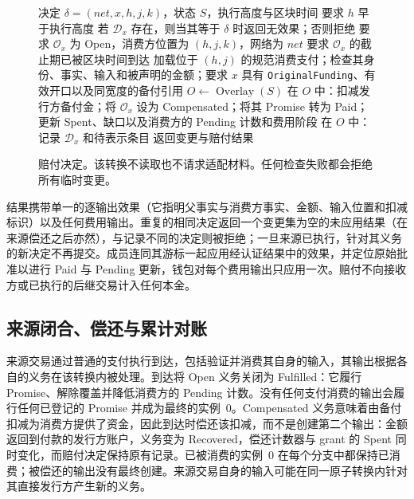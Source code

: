 \begin{figure}[t]
  \small
  \begin{algorithmic}[1]
    \REQUIRE 决定 $\delta=(\mathit{net},x,h,j,k)$，状态 $S$，执行高度与区块时间
    \STATE 要求 $h$ 早于执行高度
    \STATE 若 $\mathcal D_x$ 存在，则当其等于 $\delta$ 时返回无效果；否则拒绝
    \STATE 要求 $\mathcal O_x$ 为 Open，消费方位置为 $(h,j,k)$，网络为 $\mathit{net}$
    \STATE 要求 $\mathcal O_x$ 的截止期已被区块时间到达
    \STATE 加载位于 $(h,j)$ 的规范消费支付；检查其身份、事实、输入和被声明的金额；要求 $x$ 具有 \texttt{OriginalFunding}、有效开口以及同宽度的备付引用
    \STATE $O\gets\operatorname{Overlay}(S)$
    \STATE 在 $O$ 中：扣减发行方备付金；将 $\mathcal O_x$ 设为 Compensated；将其 Promise 转为 Paid；更新 Spent、缺口以及消费方的 Pending 计数和费用阶段
    \STATE 在 $O$ 中：记录 $\mathcal D_x$ 和待表示条目
    \STATE 返回变更与赔付结果
  \end{algorithmic}
  \caption{赔付决定。该转换不读取也不请求适配材料。任何检查失败都会拒绝所有临时变更。}
  \label{fig:protocol-decision}
\end{figure}

结果携带单一的逐输出效果（它指明父事实与消费方事实、金额、输入位置和扣减标识）以及任何费用输出。重复的相同决定返回一个变更集为空的未应用结果（在来源偿还之后亦然），与记录不同的决定则被拒绝；一旦来源已执行，针对其义务的新决定不再提交。成员连同其游标一起应用经认证结果中的效果，并定位原始批准以进行 Paid 与 Pending 更新，钱包对每个费用输出只应用一次。赔付不向接收方或已执行的后继交易计入任何本金。
\subsection{来源闭合、偿还与累计对账}
\label{sec:protocol-closure}

来源交易通过普通的支付执行到达，包括验证并消费其自身的输入，其输出根据各自的义务在该转换内被处理。到达将 Open 义务关闭为 Fulfilled：它履行 Promise、解除覆盖并降低消费方的 Pending 计数。没有任何支付消费的输出会履行任何已登记的 Promise 并成为最终的实例~0。Compensated 义务意味着由备付扣减为消费方提供了资金，因此到达时偿还该扣减，而不是创建第二个输出：金额返回到付款的发行方账户，义务变为 Recovered，偿还计数器与 grant 的 Spent 同时变化，而赔付决定保持原有记录。已被消费的实例~0 在每个分支中都保持已消费；被偿还的输出没有最终创建。来源交易自身的输入可能在同一原子转换内针对其直接发行方产生新的义务。

